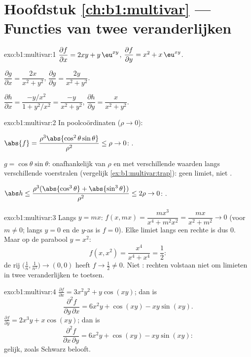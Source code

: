 \section*{Hoofdstuk \ref{ch:b1:multivar} --- Functies van twee
veranderlijken}

\begin{solution}{exo:b1:multivar:1}
$\dfrac{\partial f}{\partial x} = 2xy + y\,\eu^{xy}$,
$\dfrac{\partial f}{\partial y} = x^2 + x\,\eu^{xy}$.

$\dfrac{\partial g}{\partial x} = \dfrac{2x}{x^2+y^2}$,
$\dfrac{\partial g}{\partial y} = \dfrac{2y}{x^2+y^2}$.

$\dfrac{\partial h}{\partial x} = \dfrac{-y/x^2}{1 + y^2/x^2} =
\dfrac{-y}{x^2+y^2}$,
$\dfrac{\partial h}{\partial y} = \dfrac{x}{x^2+y^2}$.
\end{solution}

\begin{solution}{exo:b1:multivar:2}
In poolcoördinaten ($\rho \to 0$):

$\abs{f} = \dfrac{\rho^3\abs{\cos^2\theta\sin\theta}}{\rho^2} \leq
\rho \to 0$: .

$g = \cos\theta\sin\theta$: onafhankelijk van $\rho$ en met
verschillende waarden langs verschillende voerstralen (vergelijk
\cref{ex:b1:multivar:trap}): geen limiet, niet .

$\abs h \leq \dfrac{\rho^3(\abs{\cos^3\theta} +
\abs{\sin^3\theta})}{\rho^2} \leq 2\rho \to 0$: .
\end{solution}

\begin{solution}{exo:b1:multivar:3}
Langs $y = mx$: $f(x, mx) = \dfrac{m x^3}{x^4 + m^2 x^2} =
\dfrac{mx}{x^2 + m^2} \to 0$ (voor $m \neq 0$; langs $y = 0$ en de
$y$-as is $f = 0$). Elke limiet langs een rechte is dus $0$. Maar op
de parabool $y = x^2$:
\[
f(x, x^2) = \frac{x^4}{x^4 + x^4} = \frac12 :
\]
de rij $\bigl(\frac1n, \frac{1}{n^2}\bigr) \to (0,0)$ heeft $f \to
\frac12 \neq 0$. Niet : rechten volstaan niet om limieten in
twee veranderlijken te toetsen.
\end{solution}

\begin{solution}{exo:b1:multivar:4}
$\frac{\partial f}{\partial x} = 3x^2y^2 + y\cos(xy)$; dan is
\[
\frac{\partial^2 f}{\partial y\,\partial x}
= 6x^2 y + \cos(xy) - xy\sin(xy) .
\]
$\frac{\partial f}{\partial y} = 2x^3 y + x\cos(xy)$; dan is
\[
\frac{\partial^2 f}{\partial x\,\partial y}
= 6x^2 y + \cos(xy) - xy\sin(xy) :
\]
gelijk, zoals Schwarz belooft.
\end{solution}

